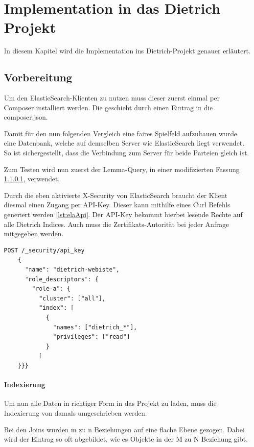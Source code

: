 \chapter{Implementation in das Dietrich Projekt}

In diesem Kapitel wird die Implementation ins Dietrich-Projekt genauer erläutert.

\section{Vorbereitung}

Um den ElasticSearch-Klienten zu nutzen muss dieser zuerst einmal per Composer installiert werden. Die geschieht durch einen Eintrag in die composer.json.

Damit für den nun folgenden Vergleich eine faires Spielfeld aufzubauen wurde eine Datenbank, welche auf demselben Server wie ElasticSearch liegt verwendet. So ist sichergestellt, dass die Verbindung zum Server für beide Parteien gleich ist.

Zum Testen wird nun zuerst der Lemma-Query, in einer modifizierten Fassung \ref{lemmaIndexierungEla}, verwendet.

Durch die eben aktivierte X-Security von ElasticSearch braucht der Klient diesmal einen Zugang per API-Key. Dieser kann mithilfe eines Curl Befehls generiert werden \ref{lst:elaApi}. Der API-Key bekommt hierbei lesende Rechte auf alle Dietrich Indices. Auch muss die Zertifikats-Autorität bei jeder Anfrage mitgegeben werden. 

\begin{lstlisting}[language=XML, frame=single, label={lst:elaApi}] 
    POST /_security/api_key
    {
      "name": "dietrich-webiste",
      "role_descriptors": { 
        "role-a": {
          "cluster": ["all"],
          "index": [
            {
              "names": ["dietrich_*"],
              "privileges": ["read"]
            }
          ]
    }}}
\end{lstlisting}


\subsubsection{Indexierung}
\label{lemmaIndexierungEla}

Um nun alle Daten in richtiger Form in das Projekt zu laden, muss die Indexierung von damals umgeschrieben werden. 

Bei den Joins wurden m zu n Beziehungen auf eine flache Ebene gezogen. Dabei wird der Eintrag so oft abgebildet, wie es Objekte in der M zu N Beziehung gibt. 

